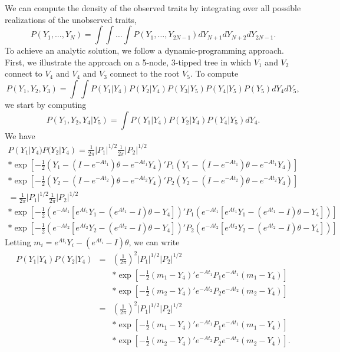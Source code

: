 \documentclass[12pt]{article}
\begin{document}
We can compute the density of the observed traits by integrating over all possible realizations of the
unobserved traits,
\begin{equation}
P(Y_1,...,Y_N) = \int \int \dots \int P(Y_1, \dots, Y_{2N-1}) dY_{N+1} dY_{N+2} dY_{2N-1}.
\end{equation}
To achieve an analytic solution, we follow a dynamic-programming approach.  First, we illustrate the approach on a
5-node, 3-tipped tree in which $V_1$ and $V_2$ connect to $V_4$ and $V_4$ and $V_3$ connect to the root $V_5$.  
To compute
\begin{equation}
P(Y_1,Y_2,Y_3) = \int \int P(Y_1 | Y_4) P(Y_2 | Y_4)  P(Y_3 | Y_5) P(Y_4 | Y_5) P(Y_5) dY_4 dY_5 ,
\end{equation}
we start by computing
\begin{equation}
P(Y_1,Y_2,Y_4 | Y_5) = \int  P(Y_1 | Y_4) P(Y_2 | Y_4) P(Y_4 | Y_5) dY_4.
\end{equation}
We have
\begin{eqnarray}
P(Y_1 | Y_4) P(Y_2 | Y_4 )  =  \frac{1}{ 2 \pi}  |P_1|^{1/2}   \frac{1}{ 2 \pi} |P_2|^{1/2} \\
 * \exp \left[ -\frac{1}{2} \left( Y_1 - (I - e^{-At_1}) \theta - e^{-At_1} Y_4 \right)' P_1 \left( Y_1 - (I - e^{-At_1}) \theta - e^{-At_1} Y_4   \right)   \right] \\
 * \exp \left[ -\frac{1}{2} \left( Y_2 - (I - e^{-At_2}) \theta - e^{-At_2} Y_4  \right)' P_2 \left( Y_2 - (I - e^{-At_2}) \theta - e^{-At_2} Y_4   \right)   \right] \\
 =  \frac{1}{ 2 \pi}  |P_1|^{1/2}   \frac{1}{ 2 \pi} |P_2|^{1/2} \\
 * \exp \left[ -\frac{1}{2} \left( e^{-At_1}  [e^{At_1} Y_1 - (e^{At_1} - I) \theta - Y_4] \right)' P_1 \left(  e^{-At_1}  [e^{At_1} Y_1 - (e^{At_1} - I) \theta - Y_4]   \right)   \right] \\
 * \exp \left[ -\frac{1}{2} \left( e^{-At_2}  [e^{At_2} Y_2 - (e^{At_2} - I) \theta - Y_4]  \right)' P_2 \left( e^{-At_2}  [e^{At_2} Y_2 - (e^{At_2} - I) \theta - Y_4]   \right)   \right] 
\end{eqnarray}
Letting $m_i = e^{At_i} Y_i - (e^{At_i} - I) \theta $, we can write
\begin{eqnarray}
P(Y_1 | Y_4) P(Y_2 | Y_4 ) & = &  \left( \frac{1}{2 \pi} \right) ^{2} |P_1|^{1/2} |P_2|^{1/2}  \\
& & * \exp \left[ -\frac{1}{2} \left( m_1  - Y_4  \right)' e^{-At_1} P_1 e^{-At_1} \left( m_1 - Y_4  \right)  \right] \\
 & & * \exp \left[ -\frac{1}{2} \left(m_2 - Y_4 \right)' e^{-At_2} P_2 e^{-At_2} \left( m_2 - Y_4  \right)   \right] \\
 & = &  \left( \frac{1}{2 \pi} \right) ^{2} |P_1|^{1/2} |P_2|^{1/2}  \\
& & * \exp \left[ -\frac{1}{2} \left( m_1  - Y_4  \right)' e^{-At_1} P_1 e^{-At_1} \left( m_1 - Y_4  \right)  \right] \\
 & & * \exp \left[ -\frac{1}{2} \left(m_2 - Y_4 \right)' e^{-At_2} P_2 e^{-At_2} \left( m_2 - Y_4  \right)   \right] .
\end{eqnarray}
\end{document}
